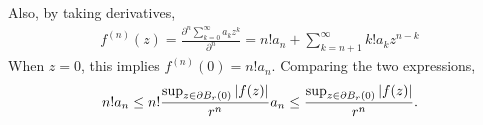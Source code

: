 \documentclass{homework}
\begin{document}
\begin{solution}
                                                                                                                                                                              Also, by taking derivatives, 
                                                                                                                                                                              \begin{align*}
                                                                                                                                                                                  f^{(n)}(z) = \frac{\partial^n \sum_{k=0}^\infty a_kz^k }{\partial ^n} = n!a_n + \sum_{k=n+1}^\infty k!a_k z^{n-k}
                                                                                                                                                                                  \end{align*}
                                                                                                                                                                                  When $z=0$, this implies $f^{(n)}(0) = n!a_n$.
                                                                                                                                                                                  Comparing the two expressions,
                                                                                                                                                                                  \begin{align*}
                                                                                                                                                                                      n!a_n \leq n!\frac{\sup_{z\in\partial B_r(0)} \left|f(z)\right|}{r^{n}}
                                                                                                                                                                                          a_n \leq \frac{\sup_{z\in\partial B_r(0)} \left|f(z)\right|}{r^{n}}.
                                                                                                                                                                                          \end{align*}
                                                                                                                                                                                          \end{solution}
\end{document}
